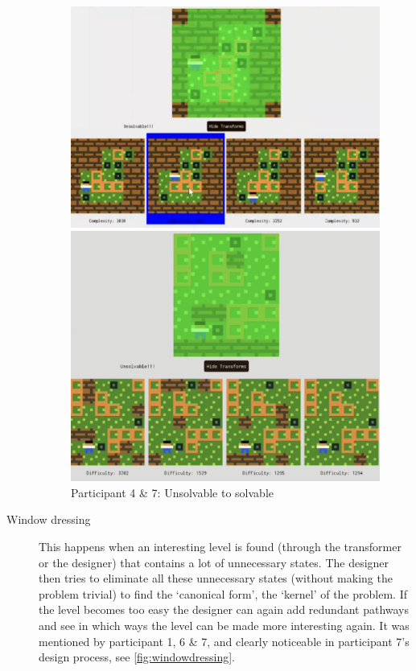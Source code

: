 \begin{description}
\begin{figure}[!htbp]
\begin{minipage}{0.5\textwidth}
\centering
\includegraphics[width=\textwidth]{figures/unsolvablepart4.png}
\end{minipage}  \hfill
\begin{minipage}{0.5\textwidth}
\centering
\includegraphics[width=\textwidth]{figures/unsolvablepart72.png}
\end{minipage}
\caption{Participant 4 \& 7: Unsolvable to solvable}
\end{figure}

\item[Window dressing] This happens when an interesting level is found (through the transformer or the designer) that contains a lot of unnecessary states. The designer then tries to eliminate all these unnecessary states (without making the problem trivial) to find the `canonical form', the `kernel' of the problem. If the level becomes too easy the designer can again add redundant pathways and see in which ways the level can be made more interesting again. It was mentioned by participant 1, 6 \& 7, and clearly noticeable in participant 7's design process, see \autoref{fig:windowdressing}. %


\end{description}

